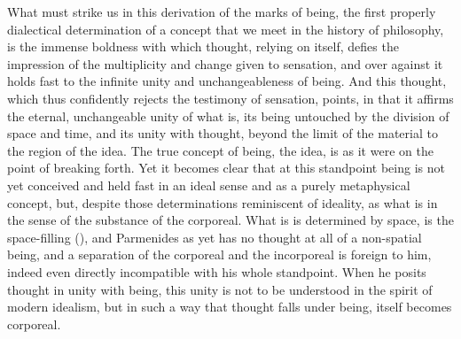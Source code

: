 What must strike us in this derivation of the marks of being,
the first properly dialectical determination of a concept that we meet
in the history of philosophy, is the
immense boldness with which thought, relying on itself,
defies the impression of the multiplicity and change given to sensation,
and over against it holds fast to the infinite
unity and unchangeableness of being. And this thought, which thus
confidently rejects the testimony of sensation, points, in that it
affirms the eternal, unchangeable unity of what is, its being untouched by the division of space and time, and its unity
with thought, beyond the limit of the material to the region of the idea.
The true concept of being, the idea, is as it were on the point of breaking
forth. Yet it becomes clear that at this standpoint being is not yet conceived and held fast in an ideal sense
and as a purely metaphysical concept, but, despite those determinations reminiscent of ideality, as what is in the sense
of the substance of the corporeal. What is is determined by
space, is the space-filling (), and Parmenides
as yet has no thought at all of a non-spatial being, and a
separation of the corporeal and the incorporeal is foreign to him, indeed even directly incompatible with his whole standpoint.
When he posits thought in unity with being, this
unity is not to be understood in the spirit of modern idealism, but
in such a way that thought falls under being, itself becomes
corporeal.

